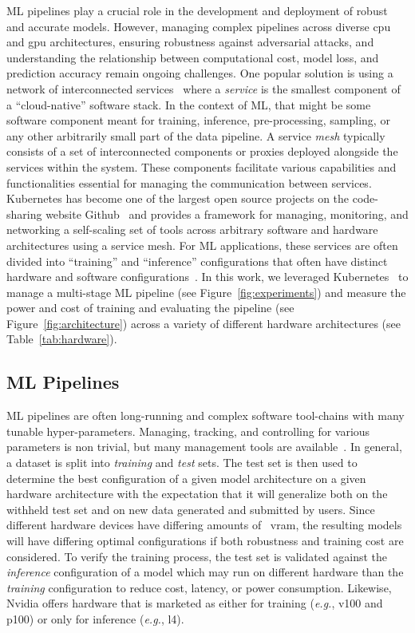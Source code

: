 \documentclass[sn-mathphys-num]{sn-jnl}%
\begin{document}
ML pipelines play a crucial role in the development and deployment of robust and accurate models. However, managing complex pipelines across diverse \acrfull{cpu} and \acrfull{gpu}  architectures, ensuring robustness against adversarial attacks, and understanding the relationship between computational cost, model loss, and prediction accuracy remain ongoing challenges.
One popular solution is using a network of interconnected services~\cite{panchal2024reusable,hasselbring2017microservice,zhou2022online,singh2023load} where a \textit{service} is the smallest component of a ``cloud-native'' software stack. In the context of ML, that might be some software component meant for training, inference, pre-processing, sampling, or any other arbitrarily small part of the data pipeline.
A service \textit{mesh} typically consists of a set of interconnected components or proxies deployed alongside the services within the system.  These components facilitate various capabilities and functionalities essential for managing the communication between services. Kubernetes has become one of the largest open source projects on the code-sharing website Github~\cite{k8s-size} and provides a framework for managing, monitoring, and networking a self-scaling set of tools across arbitrary software and hardware architectures using a service mesh. For ML applications, these services are often divided into ``training'' and ``inference'' configurations that often have distinct hardware and software configurations~\cite{wang2019benchmarking}. In this work, we leveraged Kubernetes~\cite{k8s} to manage a multi-stage ML pipeline (see Figure~\ref{fig:experiments}) and measure the power and cost of training and evaluating the pipeline (see Figure~\ref{fig:architecture}) across a variety of different hardware architectures (see Table~\ref{tab:hardware}).


\subsection{ML Pipelines}
\label{ml_pipelines}
ML pipelines are often long-running and complex software tool-chains with many tunable hyper-parameters.
Managing, tracking, and controlling for various parameters is non trivial, but many management tools are available~\cite{dvc,hydra,k8s}.
In general, a dataset is split into \textit{training} and \textit{test} sets.
The test set is then used to determine the best configuration of a given model architecture on a given hardware architecture with the expectation that it will generalize both on the withheld test set and on new data generated and submitted by users.
Since different hardware devices have differing amounts of ~\acrfull{vram}, the resulting models will have differing optimal configurations if both robustness and training cost are considered.
To verify the training process, the test set is validated against the \textit{inference} configuration of a model which may run on different hardware than the \textit{training} configuration to reduce cost, latency, or power consumption. Likewise, Nvidia offers hardware that is marketed as either for training (\textit{e.g.}, v100 and p100) or only for inference (\textit{e.g.}, l4).
\end{document}
